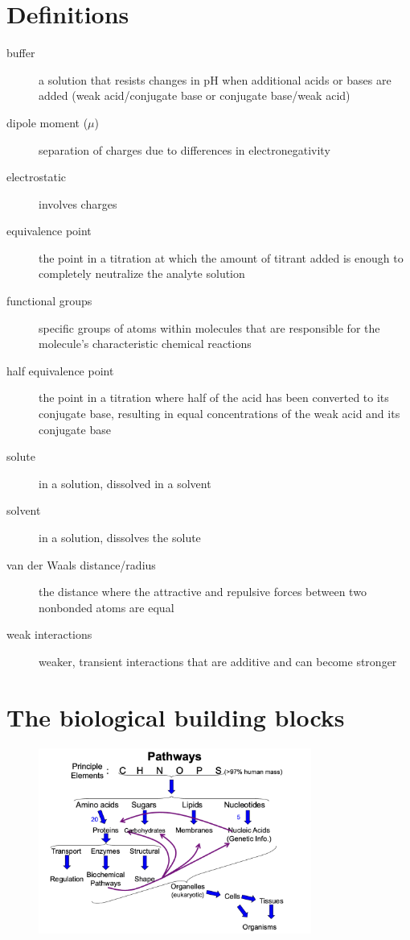 \documentclass[letterpaper, 12pt]{article}
\begin{document}
\newpage

\section*{Definitions}
\label{defs}

\begin{description}
\item [buffer] a solution that resists changes in pH when additional acids or bases are added (weak acid/conjugate base or conjugate base/weak acid)
\item [dipole moment ($\mu$)] separation of charges due to differences in electronegativity
\item [electrostatic] involves charges
\item [equivalence point] the point in a titration at which the amount of titrant added is enough to completely neutralize the analyte solution
\item [functional groups] specific groups of atoms within molecules that are responsible for the molecule's characteristic chemical reactions
\item [half equivalence point] the point in a titration where half of the acid has been converted to its conjugate base, resulting in equal concentrations of the weak acid and its conjugate base
\item [solute] in a solution, dissolved in a solvent
\item [solvent] in a solution, dissolves the solute
\item [van der Waals distance/radius] the distance where the attractive and repulsive forces between two nonbonded atoms are equal
\item [weak interactions] weaker, transient interactions that are additive and can become stronger
\end{description}

\newpage

\section*{The biological building blocks}

\begin{figure}[H]
\centering
\includegraphics[width=0.8\textwidth]{pathways}
\end{figure}
\end{document}
